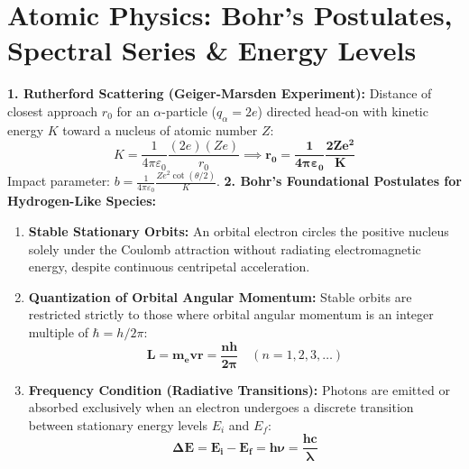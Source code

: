 \documentclass[10pt,twoside,openright]{book}
\begin{document}
\section{Atomic Physics: Bohr's Postulates, Spectral Series \& Energy Levels}

\begin{conceptbox}
\textbf{1. Rutherford Scattering (Geiger-Marsden Experiment):}
Distance of closest approach $r_0$ for an $\alpha$-particle ($q_\alpha = 2e$) directed head-on with kinetic energy $K$ toward a nucleus of atomic number $Z$:
\begin{equation}
  K = \frac{1}{4\pi\varepsilon_0}\frac{(2e)(Ze)}{r_0} \implies \mathbf{r_0 = \frac{1}{4\pi\varepsilon_0}\frac{2 Z e^2}{K}}
\end{equation}
Impact parameter: $b = \frac{1}{4\pi\varepsilon_0}\frac{Z e^2 \cot(\theta/2)}{K}$.
\textbf{2. Bohr's Foundational Postulates for Hydrogen-Like Species:}
\begin{enumerate}
  \item \textbf{Stable Stationary Orbits:} An orbital electron circles the positive nucleus solely under the Coulomb attraction without radiating electromagnetic energy, despite continuous centripetal acceleration.
  \item \textbf{Quantization of Orbital Angular Momentum:} Stable orbits are restricted strictly to those where orbital angular momentum is an integer multiple of $\hbar = h / 2\pi$:
  \begin{equation}
    \mathbf{L = m_e v r = \frac{n h}{2\pi}} \quad (n = 1, 2, 3, \dots)
  \end{equation}
  \item \textbf{Frequency Condition (Radiative Transitions):} Photons are emitted or absorbed exclusively when an electron undergoes a discrete transition between stationary energy levels $E_i$ and $E_f$:
  \begin{equation}
    \mathbf{\Delta E = E_i - E_f = h\nu = \frac{hc}{\lambda}}
  \end{equation}
\end{enumerate}
\end{conceptbox}
\end{document}

